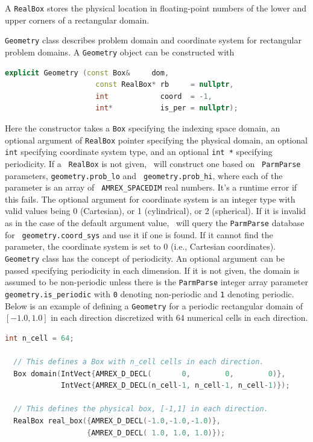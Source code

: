 {A {\tt RealBox} stores the physical location in floating-point numbers
of the lower and upper corners of a rectangular domain.

{\tt Geometry} class describes problem domain and coordinate system
for rectangular problem domains.  A {\tt Geometry} object can be
constructed with
\begin{lstlisting}[language=cpp]
  explicit Geometry (const Box&     dom,
                     const RealBox* rb     = nullptr,
                     int            coord  = -1,
                     int*           is_per = nullptr);
\end{lstlisting}
Here the constructor takes a {\tt Box} specifying the indexing space
domain, an optional argument of {\tt RealBox} pointer specifying the
physical domain, an optional {\tt int} specifying coordinate system
type, and an optional {\tt int *} specifying periodicity.  If a {\tt
  RealBox} is not given, \amrex\ will construct one based on {\tt
  ParmParse} parameters, {\tt geometry.prob\_lo} and {\tt
  geometry.prob\_hi}, where each of the parameter is an array of {\tt
  AMREX\_SPACEDIM} real numbers.  It's a runtime error if this fails.
The optional argument for coordinate system is an integer type with
valid values being 0 (Cartesian), or 1 (cylindrical), or 2
(spherical).  If it is invalid as in the case of the default argument
value, \amrex\ will query the {\tt ParmParse} database for {\tt
  geometry.coord\_sys} and use it if one is found.  If it cannot find
the parameter, the coordinate system is set to 0 (i.e., Cartesian
coordinates).  {\tt Geometry} class has the concept of periodicity.
An optional argument can be passed specifying periodicity in each
dimension.  If it is not given, the domain is assumed to be
non-periodic unless there is the {\tt ParmParse} integer array
parameter {\tt geometry.is\_periodic} with {\tt 0} denoting
non-periodic and {\tt 1} denoting periodic.  Below is an example of
defining a {\tt Geometry} for a periodic rectangular domain of
$[-1.0,1.0]$ in each direction discretized with $64$ numerical cells
in each direction.
\begin{lstlisting}[language=cpp]
  int n_cell = 64;

  // This defines a Box with n_cell cells in each direction.
  Box domain(IntVect{AMREX_D_DECL(       0,        0,        0)},
             IntVect{AMREX_D_DECL(n_cell-1, n_cell-1, n_cell-1)});

  // This defines the physical box, [-1,1] in each direction.
  RealBox real_box({AMREX_D_DECL(-1.0,-1.0,-1.0)},
                   {AMREX_D_DECL( 1.0, 1.0, 1.0)});
  

\end{lstlisting}}
